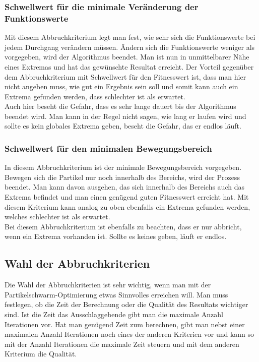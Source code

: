 \subsubsection{Schwellwert für die minimale Veränderung der Funktionswerte}
Mit diesem Abbruchkriterium legt man fest, wie sehr sich die Funktionswerte bei jedem Durchgang verändern müssen. Ändern sich die Funktionswerte weniger als vorgegeben, wird der Algorithmus beendet. Man ist nun in unmittelbarer Nähe eines Extremas und hat das gewünschte Resultat erreicht. Der Vorteil gegenüber dem Abbruchkriterium mit Schwellwert für den Fitnesswert ist, dass man hier nicht angeben muss, wie gut ein Ergebnis sein soll und somit kann auch ein Extrema gefunden werden, dass schlechter ist als erwartet. \\ 

Auch hier beseht die Gefahr, dass es sehr lange dauert bis der Algorithmus beendet wird. Man kann in der Regel nicht sagen, wie lang er laufen wird und sollte es kein globales Extrema geben, beseht die Gefahr, das er endlos läuft. 

\subsubsection{Schwellwert für den minimalen Bewegungsbereich}
In diesem Abbruchkriterium ist der minimale Bewegungsbereich vorgegeben. Bewegen sich die Partikel nur noch innerhalb des Bereichs, wird der Prozess beendet. Man kann davon ausgehen, das sich innerhalb des Bereichs auch das Extrema befindet und man einen genügend guten Fitnesswert erreicht hat. Mit diesem Kriterium kann analog zu oben ebenfalls ein Extrema gefunden werden, welches schlechter ist als erwartet.\\

Bei diesem Abbruchkriterium ist ebenfalls zu beachten, dass er nur abbricht, wenn ein Extrema vorhanden ist. Sollte es keines geben, läuft er endlos.

\subsection{Wahl der Abbruchkriterien}
Die Wahl der Abbruchkriterien ist sehr wichtig, wenn man mit der Partikelschwarm-Optimierung etwas Sinnvolles erreichen will. Man muss festlegen, ob die Zeit der Berechnung oder die Qualität des Resultats wichtiger sind. Ist die Zeit das Ausschlaggebende gibt man die maximale Anzahl Iterationen vor. Hat man genügend Zeit zum berechnen, gibt man nebst einer maximalen Anzahl Iterationen noch eines der anderen Kriterien vor und kann so mit der Anzahl Iterationen die maximale Zeit steuern und mit dem anderen Kriterium die Qualität. 

